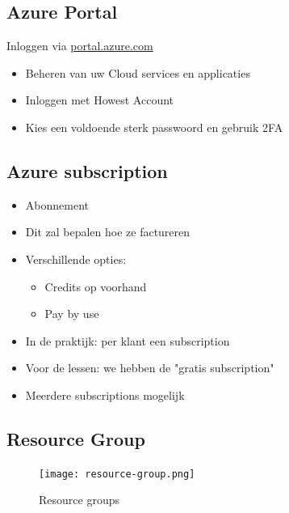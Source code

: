 \documentclass{article}
\begin{document}
\subsection{Azure Portal}

Inloggen via \url{portal.azure.com}

\begin{itemize}
    \item Beheren van uw Cloud services en applicaties
    \item Inloggen met Howest Account
    \item Kies een voldoende sterk passwoord en gebruik 2FA
\end{itemize}

\subsection{Azure subscription}
\begin{itemize}
    \item Abonnement
    \item Dit zal bepalen hoe ze factureren
    \item Verschillende opties:
    \begin{itemize}
        \item Credits op voorhand
        \item Pay by use
    \end{itemize}
    \item In de praktijk: per klant een subscription
    \item Voor de lessen: we hebben de "gratis subscription"
    \item Meerdere subscriptions mogelijk
\end{itemize}

\subsection{Resource Group}

\begin{figure}[H]
    \centering
    \texttt{[image: resource-group.png]}
    \caption{Resource groups}
\end{figure}
\end{document}
